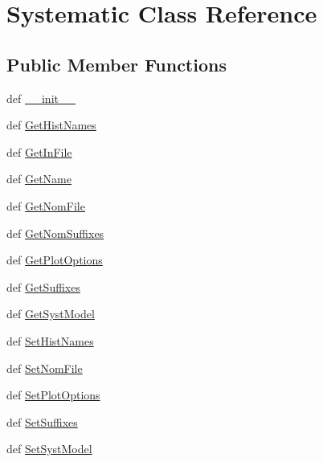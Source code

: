 \hypertarget{classGenerateSlides_1_1Systematic}{\section{Systematic Class Reference}
\label{classGenerateSlides_1_1Systematic}
}
\subsection*{Public Member Functions}
\begin{DoxyCompactItemize}
\item 
def \hyperlink{classGenerateSlides_1_1Systematic_ac775ee34451fdfa742b318538164070e}{\+\_\+\+\_\+init\+\_\+\+\_\+}
\item 
def \hyperlink{classGenerateSlides_1_1Systematic_a9e732bc155ceec6b6bbf3e4af3ca1686}{Get\+Hist\+Names}
\item 
def \hyperlink{classGenerateSlides_1_1Systematic_aecbf1614899da084211933354b7b4f1a}{Get\+In\+File}
\item 
def \hyperlink{classGenerateSlides_1_1Systematic_a6b2fded466882e14755ca61140303b06}{Get\+Name}
\item 
def \hyperlink{classGenerateSlides_1_1Systematic_ae7ab36f569fae68cf63bd79493833da1}{Get\+Nom\+File}
\item 
def \hyperlink{classGenerateSlides_1_1Systematic_aece00d66345480a61a21e5d3e49bbf2f}{Get\+Nom\+Suffixes}
\item 
def \hyperlink{classGenerateSlides_1_1Systematic_a30582b8f0c86d4fc600baf0b2093eb71}{Get\+Plot\+Options}
\item 
def \hyperlink{classGenerateSlides_1_1Systematic_a7b05184c86d6070efbabddb625565992}{Get\+Suffixes}
\item 
def \hyperlink{classGenerateSlides_1_1Systematic_af1d9c2043affb88742d717c3be120d69}{Get\+Syst\+Model}
\item 
def \hyperlink{classGenerateSlides_1_1Systematic_a280cc8ba796a6deeee9dedd77c8d113e}{Set\+Hist\+Names}
\item 
def \hyperlink{classGenerateSlides_1_1Systematic_a27e1ef2f1b68a4c6fa0e33e1d895a69a}{Set\+Nom\+File}
\item 
def \hyperlink{classGenerateSlides_1_1Systematic_a0b369d9624023f739bee06aaab4f2322}{Set\+Plot\+Options}
\item 
def \hyperlink{classGenerateSlides_1_1Systematic_ac4720c52ab0fa42be0e896bf9417d58f}{Set\+Suffixes}
\item 
def \hyperlink{classGenerateSlides_1_1Systematic_a667ce80cf55177ef923e591eeed3604b}{Set\+Syst\+Model}
\end{DoxyCompactItemize}
